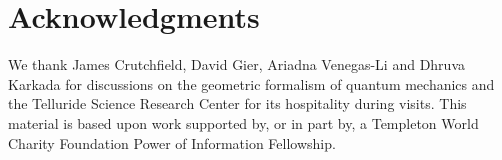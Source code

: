 \documentclass[%
 reprint,
 superscriptaddress,
 aps,
 pra,
]{revtex4-2}
\theoremstyle{definition}
\begin{document}
\section*{Acknowledgments}
\label{sec:acknowledgments}

We thank James Crutchfield, David Gier, Ariadna Venegas-Li and Dhruva Karkada
for discussions on the geometric formalism of quantum mechanics and the Telluride
Science Research Center for its hospitality during visits.  This material is
based upon work supported by, or in part by, a Templeton World Charity
Foundation Power of Information Fellowship.

\newpage

\end{document}
